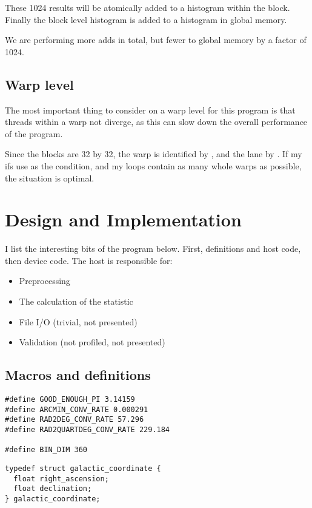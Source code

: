 \documentclass[a4paper,titlepage,12pt]{article}
\begin{document}
\begin{description}[left = \parindent]
These 1024 results will be atomically added to a histogram within the block.
Finally the block level histogram is added to a histogram in global memory.

We are performing more adds in total, but fewer to global memory by a factor of 1024.


\subsection{Warp level}

The most important thing to consider on a warp level for this program is that threads within a warp not diverge, as this can slow down the overall performance of the program.

Since the blocks are 32 by 32, the warp is identified by , and the lane by .
If my ifs use  as the condition, and my loops contain as many whole warps as possible, the situation is optimal.
\newpage
\section{Design and Implementation}

I list the interesting bits of the program below.
First, definitions and host code, then device code.
The host is responsible for:
\begin{itemize}[noitemsep]
	\item Preprocessing
	\item The calculation of the statistic
	\item File I/O (trivial, not presented)
	\item Validation (not profiled, not presented) %
\end{itemize}


\subsection{Macros and definitions}

\begin{lstlisting}
#define GOOD_ENOUGH_PI 3.14159
#define ARCMIN_CONV_RATE 0.000291
#define RAD2DEG_CONV_RATE 57.296
#define RAD2QUARTDEG_CONV_RATE 229.184

#define BIN_DIM 360
\end{lstlisting}

\begin{lstlisting}
typedef struct galactic_coordinate {
  float right_ascension;
  float declination;
} galactic_coordinate;


\end{lstlisting}
\end{description}
\end{document}
